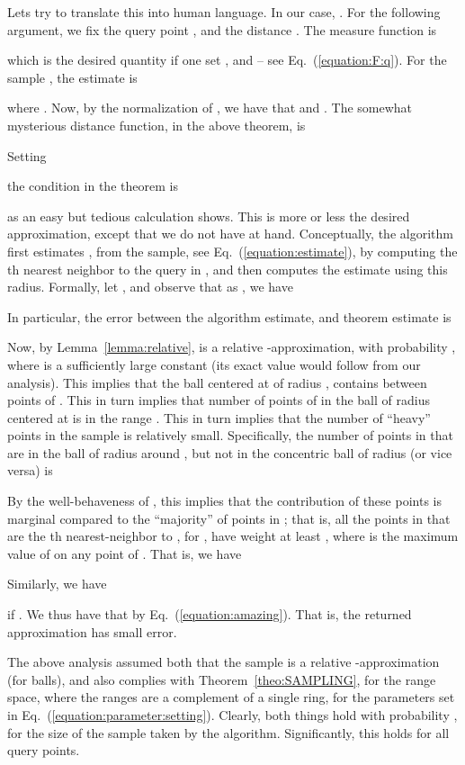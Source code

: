 \documentclass[12pt]{article}
\providecommand{\lemref}[1]{Lemma~\ref{lemma:#1}}
\theoremstyle{remark}{\theorembodyfont{\rm} \newtheorem{remark}[theorem]{Remark}}
\newcommand{\thmref}[1]{Theorem~\ref{theo:#1}}
\newcommand{\Eqref}[1]{Eq.~(\ref{equation:#1})}
\providecommand{\si}[1]{#1}
\renewcommand{\th}{th\xspace}
\begin{document}
Lets try to translate this into human language. In our case,
. For the following argument, we fix the query
point , and the distance .  The measure
function is

which is the desired quantity if one set , and
 -- see \Eqref{F:q}.  For the
sample , the estimate is

where .  Now, by the normalization of ,
we have that  and
.  The somewhat mysterious distance function, in
the above theorem, is

Setting 

the condition in the theorem is

as an easy but tedious calculation shows.  This is more or less the
desired approximation, except that we do not have  at
hand. Conceptually, the algorithm first estimates , from the
sample, see \Eqref{estimate}, by computing the \th nearest
neighbor to the query in , and then computes the estimate
using this radius. Formally, let ,
and observe that as , we have  

In particular, the error between the algorithm estimate, and theorem
estimate is 


Now, by \lemref{relative},  is a relative
-approximation, with probability , where  is a sufficiently large constant
(its exact value would follow from our analysis). This implies that
the ball centered at  of radius , contains between
 points of . This in
turn implies that number of points of  in the ball of radius
 centered at  is in the range
. This in turn
implies that the number of ``heavy'' points in the sample 
is relatively small. Specifically, the number of points in 
that are in the ball of radius  around , but not in the
concentric ball of radius  (or vice versa) is

By the well-behaveness of , this implies that the contribution of
these points is marginal compared to the ``majority'' of points in
; that is, all the points in  that are the \th
nearest-neighbor to , for , have
weight at least , where  is the maximum value
of  on any point of
. That is, we have

Similarly,  we have 

if .  We thus have that\vspace{-0.5cm}
by \Eqref{amazing}.  That is, the returned approximation has small
error.

The above analysis assumed both that the sample  is a
relative -\si{approxima}\-\si{tion} (for
balls), and also complies with \thmref{SAMPLING}, for the range space,
where the ranges are a complement of a single ring, for the parameters
set in \Eqref{parameter:setting}. Clearly, both things hold with
probability , for the size of the sample taken by the
algorithm. Significantly, this holds for all query points.
\end{document}
